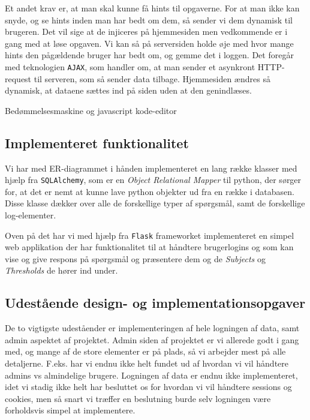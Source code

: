 \documentclass[11pt, a4paper]{article}
\begin{document}
Et andet krav er, at man skal kunne få hints til opgaverne. For at man ikke kan snyde, og se hints inden man har bedt om dem, så sender vi dem dynamisk til brugeren. Det vil sige at de injiceres på hjemmesiden men vedkommende er i gang med at løse opgaven. Vi kan så på serversiden holde øje med hvor mange hints den pågældende bruger har bedt om, og gemme det i loggen. Det foregår med teknologien \verb!AJAX!, som handler om, at man sender et asynkront HTTP-request til serveren, som så sender data tilbage. Hjemmesiden ændres så dynamisk, at dataene sættes ind på siden uden at den genindlæses.

Bedømmelsesmaskine og javascript kode-editor



\subsection{Implementeret funktionalitet}
\label{sub:implementeret_funktionalitet}
Vi har med ER-diagrammet i hånden implementeret en lang række klasser med hjælp fra \verb!SQLAlchemy!, som er en \emph{Object Relational Mapper} til python, der sørger for, at det er nemt at kunne lave python objekter ud fra en række i databasen. Disse klasse dækker over alle de forskellige typer af spørgsmål, samt de forskellige log-elementer.

Oven på det har vi med hjælp fra \verb!Flask! frameworket implementeret en simpel web applikation der har funktionalitet til at håndtere brugerlogins og som kan vise og give respons på spørgsmål og præsentere dem og de \emph{Subjects} og \emph{Thresholds} de hører ind under.

\subsection{Udestående design- og implementationsopgaver}
\label{sub:udestaende_design_og_implementationsopgaver}
De to vigtigste udeståender er implementeringen af hele logningen af data, samt admin aspektet af projektet.
Admin siden af projektet er vi allerede godt i gang med, og mange af de store elementer er på plads, så vi arbejder mest på alle detaljerne. F.eks. har vi endnu ikke helt fundet ud af hvordan vi vil håndtere admins vs almindelige brugere.
Logningen af data er endnu ikke implementeret, idet vi stadig ikke helt har besluttet os for hvordan vi vil håndtere sessions og cookies, men så snart vi træffer en beslutning burde selv logningen være forholdsvis simpel at implementere.
\end{document}
